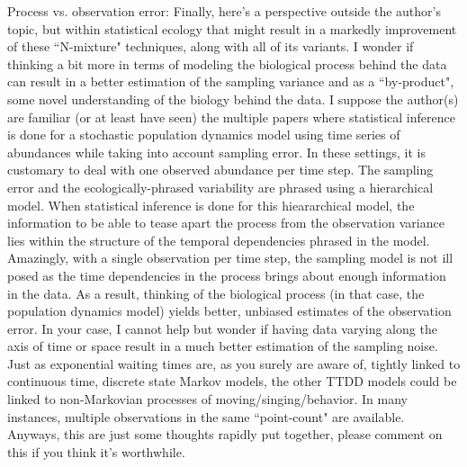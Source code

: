 \documentclass[12pt]{article}
\begin{document}
Process vs. observation error: Finally, here's a perspective outside the author's topic, but within statistical ecology that might result in a markedly improvement of these ``N-mixture" techniques, along with all of its variants. I wonder if thinking a bit more in terms of modeling the biological process behind the data can result in a better estimation of the sampling variance and as a ``by-product", some novel understanding of the biology behind the data. I suppose the author(s) are familiar (or at least have seen) the multiple papers where statistical inference is done for a stochastic population dynamics model using time series of abundances while taking into account sampling error. In these settings, it is customary to deal with one observed abundance per time step. The sampling error and the ecologically-phrased variability are phrased using a hierarchical model.  When statistical inference is done for this hieararchical model, the information to be able to tease apart
the process from the observation variance lies within the structure of the temporal dependencies phrased in the model. Amazingly, with a single observation per time step, the sampling model is not ill posed as the time dependencies in the process brings about enough information in the data.  As a result, thinking of the biological process (in that case, the population dynamics model) yields better, unbiased estimates of the observation error. In your case, I cannot help but wonder if having data varying along the axis of time or space result in a much better estimation of the sampling noise. Just as exponential waiting times are, as you surely are aware of, tightly linked to continuous time, discrete state Markov models, the other TTDD models could be linked to non-Markovian processes of moving/singing/behavior.  In many instances, multiple observations in the same ``point-count" are available. Anyways, this are just some thoughts rapidly put together, please comment on this
if you think it's worthwhile.
\end{document}
